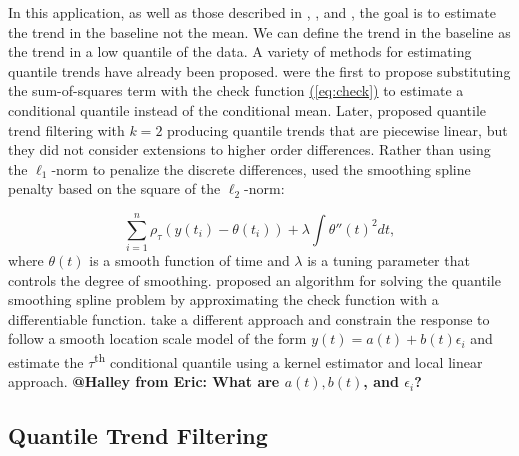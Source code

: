 \documentclass[12pt]{article}
\makeatletter
\newcommand{\Halley}[2]{{\bf {\color{purple}@Halley from #1: #2}}\xspace}
\newcommand{\Eqn}[1]{\hyperref[eq:#1]{{\rm (\ref*{eq:#1})}}} %
\newcommand{\Eqn}[1]{{(\ref{eq:#1})}} %
\makeatother
\begin{document}
	In this application, as well as those described in \cite{Ning2014}, \cite{marandi2015qualitative}, and \cite{pettersson2013algorithm}, the goal is to estimate the trend in the baseline not the mean. We can define the trend in the baseline as the trend in a low quantile of the data. A variety of methods for estimating quantile trends have already been proposed. \cite{Koenker1978} were the first to propose substituting the sum-of-squares term with the check function  \Eqn{check} to estimate a conditional quantile instead of the conditional mean. Later, \cite{KoenkerNgPortnoy1994} proposed quantile trend filtering with $k = 2$ producing quantile trends that are piecewise linear, but they did not consider extensions to higher order differences. Rather than using the $\ell_1$-norm to penalize the discrete differences, \cite{nychka1995nonparametric} used the smoothing spline penalty based on the square of the $\ell_2$-norm: 
	
	\begin{equation*}
	\label{eq:smoothingspline}
	\sum_{i=1}^n\rho_{\tau}(y(t_i) - \theta(t_i)) + \lambda\int \theta''(t)^2 dt, 
 	\end{equation*}	
	where $\theta(t)$ is a smooth function of time and $\lambda$ is a tuning parameter that controls the degree of smoothing. \cite{Oh2011} proposed an algorithm for solving the quantile smoothing spline problem by approximating the check function with a differentiable function. \cite{Racine2017} take a different approach and constrain the response to follow a smooth location scale model of the form $y(t) = a(t) + b(t)\epsilon_i$ and estimate the $\tau$\textsuperscript{th} conditional quantile using a kernel estimator and local linear approach. \Halley{Eric}{What are $a(t), b(t)$, and $\epsilon_i$?}


\subsection{Quantile Trend Filtering}
\end{document}
